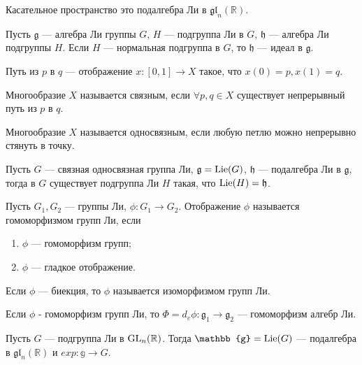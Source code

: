 \begin{ass}
Касательное пространство это подалгебра Ли в $\mathfrak{gl}_n(\mathbb{R})$.
\end{ass}

\begin{thm}
Пусть $\mathfrak{g}$ — алгебра Ли группы $G$, $H$ — подгруппа Ли в $G$, $\mathfrak{h}$ — алгебра Ли подгруппы $H$. Если $H$ — нормальная подгруппа в $G$, то $\mathfrak{h}$ — идеал в $\mathfrak{g}$.
\end{thm}

\begin{defi}
Путь из $p$ в $q$ — отображение $x:[0,1]\to X$ такое, что $x(0) = p,x(1)=q$.
\end{defi}

\begin{defi}
Многообразие $X$ называется связным, если $\forall p,q\in X$ существует непрерывный путь из $p$ в $q$.
\end{defi}

\begin{defi}
Многообразие $X$ называется односвязным, если любую петлю можно непрерывно стянуть в точку.
\end{defi}

\begin{ass}
Пусть $G$ — связная односвязная группа Ли, $\mathfrak{g}=\operatorname{Lie}(G)$, $\mathfrak{h}$ — подалгебра Ли в $\mathfrak{g}$, тогда в $G$ существует подгруппа Ли $H$ такая, что $\operatorname{Lie}(H)=\mathfrak{h}$.
\end{ass}

\begin{defi}
Пусть $G_1,G_2$ — группы Ли, $\phi:G_1\to G_2$. Отображение $\phi$ называется гомоморфизмом групп Ли, если
\begin{enumerate}
\item $\phi$ — гомоморфизм групп;
\item $\phi$ — гладкое отображение.
\end{enumerate}
Если $\phi$ — биекция, то $\phi$ называется изоморфизмом групп Ли.
\end{defi}

\begin{thm}
Если $\phi$ - гомоморфизм групп Ли, то $\Phi=d_e\phi:\mathfrak{g}_1\to\mathfrak{g}_2$ — гомоморфизм алгебр Ли.
\end{thm}

\begin{thm}
Пусть $G$ — подгруппа Ли в $\operatorname{GL}_n(\mathbb{R})$. Тогда $\mathbb{g}=\Lie(G)$ — подалгебра в $\mathfrak{gl}_n(\mathbb{R})$ и $exp:\mathbb{g}\to G$.
\end{thm}

